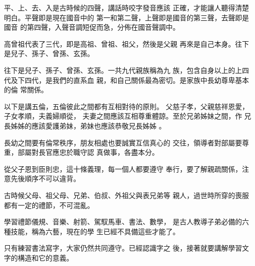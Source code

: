 \documentclass[avery5371,grid]{flashcards}
\begin{document}
{平、上、去、入是古時候的四聲，講話時咬字發音應該
正確，才能讓人聽得清楚明白。平聲即是現在國音中的
第一和第二聲，上聲即是國音的第三聲，去聲即是國音
的第四聲，入聲音調短促而急，分佈在國音聲調中。} %
{} %

{高曾祖代表了三代，即是高祖、曾祖、祖父，然後是父親
再來是自己本身。往下是兒子、孫子、曾孫、玄孫。} %
{} %







{往下是兒子、孫子、曾孫、玄孫。一共九代親族稱為九
族，包含自身以上的上四代及下四代，是我們的直系血
親，和自己關係最為密切。是家族中長幼尊卑基本的倫
常關係。} %
{} %


{以下是講五倫，五倫彼此之間都有互相對待的原則。
父慈子孝，父親慈祥恩愛，子女孝順，夫義婦順從，
夫妻之間應該互相尊重體諒。至於兄弟姊妹之間，作
兄長姊姊的應該愛護弟妹，弟妹也應該恭敬兄長姊姊
。} %
{} %


{長幼之間要有倫常秩序，朋友相處也要誠實互信真心的
交往，領導者對部屬要尊重，部屬對長官應忠於職守認
真做事，各盡本分。} %
{} %


{從父子恩到臣則忠，這十條義理，每一個人都要遵守
奉行，要了解親疏關係，注意先後順序不可以違背。} %
{} %


{古時候父母、祖父母、兄弟、伯叔、外祖父與表兄弟等
親人，過世時所穿的喪服都有一定的禮節，不可混亂。} %
{} %

{學習禮節儀規、音樂、射箭、駕馭馬車、書法、數學，
是古人教導子弟必備的六種技能，稱為六藝，現在的學
生已經不具備這些才能了。} %
{} %





{只有練習書法寫字，大家仍然共同遵守。已經認識字之
後，接著就要講解學習文字的構造和它的意義。} %
{} %
\end{document}
